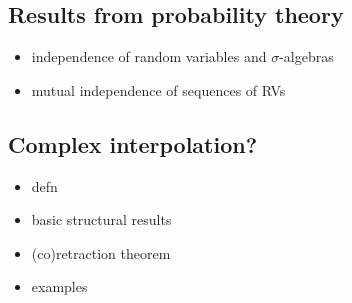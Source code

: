 \subsection{Results from probability theory}

\begin{itemize}
\item independence of random variables and $\sigma$-algebras
\item mutual independence of sequences of RVs
\end{itemize}

\subsection{Complex interpolation?}

\begin{itemize}
\item defn
\item basic structural results
\item (co)retraction theorem
\item examples 
\end{itemize}


